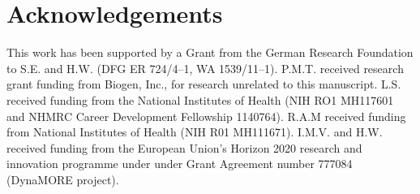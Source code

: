 \documentclass{lea}
\begin{document}








\section{Acknowledgements}

This work has been supported by a Grant from the German Research
Foundation to S.E. and H.W. (DFG ER 724/4--1, WA 1539/11--1).
P.M.T. received research grant funding from Biogen, Inc., for research
unrelated to this manuscript.
L.S. received funding from the National Institutes of Health (NIH RO1
MH117601 and NHMRC Career Development Fellowship 1140764).
R.A.M received funding from National Institutes of Health (NIH R01
MH111671).
I.M.V. and H.W. received funding from the European Union's Horizon 2020
research and innovation programme under under Grant Agreement number
777084 (DynaMORE project).

\printbibliography
\end{document}
